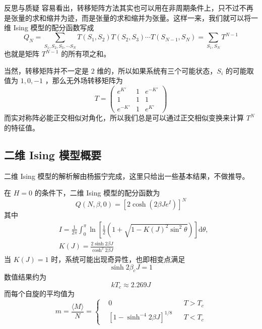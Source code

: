 \begin{justification}{\kaishu 反思与质疑}
\kaishu \fontsize{11pt}{16pt}
\quad\quad 容易看出，转移矩阵方法其实也可以用在非周期条件上，只不过不再是张量的求和缩并为迹，而是张量的求和缩并为张量。这样一来，我们就可以将一维 Ising 模型的配分函数写成
\begin{equation}
    Q_N = \sum_{S_1,S_2,S_3,\cdots S_N} T(S_1,S_2) T(S_2,S_3) \cdots T(S_{N-1},S_{N}) = \sum_{S_1, S_N} T^{N-1}
\end{equation}
也就是矩阵 $T^{N-1}$ 的所有项之和。

\quad\quad 当然，转移矩阵并不一定是 $2$ 维的，所以如果系统有三个可能状态，$S_i$ 的可能取值为 $1,0,-1$ ，那么无外场转移矩阵为
\begin{equation}
    T = \begin{pmatrix}
        e^{K'} & 1 & e^{-K'} \\
        1 & 1 & 1 \\
        e^{-K'} & 1 & e^{K'}
    \end{pmatrix}
\end{equation}
而实对称阵必能正交相似对角化，所以我们总是可以通过正交相似变换来计算 $T^N$ 的特征值。
\end{justification}

\subsection{二维 Ising 模型概要}\label{sub:二维 Ising 模型概要}

二维 Ising 模型的解析解由杨振宁完成，这里只给出一些基本结果，不做推导。

在 $H = 0$ 的条件下，二维 Ising 模型的配分函数为
\begin{equation}
    Q(N,\beta,0) = \left[2\cosh (2\beta J e^I)\right]^N
\end{equation}
其中
\begin{align*}
    &I = \frac{1}{2\pi} \int_0^\pi \ln \left[\frac{1}{2} \left(1 + \sqrt{1 -K(J)^2\sin^2 \theta}\right)\right] \mathrm{d}\theta, \\
    &K(J) = \frac{2\sinh 2\beta J}{\cosh^2 2\beta J}
\end{align*}
当 $K(J) = 1$ 时，系统可能出现奇异性，也即相变点满足
\begin{equation}
    \sinh 2\beta_c J = 1
\end{equation}
数值结果约为
\begin{equation}
    kT_c \approx 2.269J
\end{equation}
而每个自旋的平均值为
\begin{equation}
    m = \frac{\langle M \rangle}{N} = \left\{\begin{aligned}
        &0 && T > T_c \\
        &\left[1 - \sinh^{-4} 2\beta J\right]^{1/8} && T < T_c
    \end{aligned}\right.
\end{equation}

